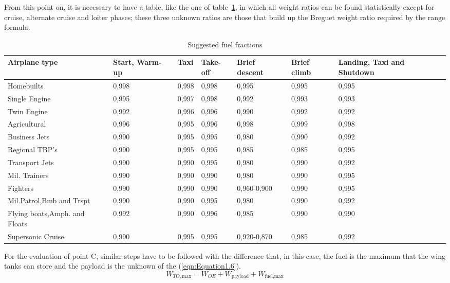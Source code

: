 \noindent
From this point on, it is necessary to have a table, like the one of table~\ref{table:Table1}, in which all weight ratios can be found statistically except for cruise, alternate cruise and loiter phases; these three unknown ratios are those that build up the Breguet weight ratio required by the range formula.   

\bigskip
\begin{table}[!ht]
\centering
\begin{tabular}{p{2.7cm}p{1.8cm}p{1.1cm}p{1.7cm}p{2.4cm}p{1.2cm}p{2.1cm}}
\toprule
\textbf{Airplane type} & \textbf{Start}, \textbf{Warm-up} & \textbf{Taxi} & \textbf{Take-off} & \textbf{Brief descent} & \textbf{Brief climb} & \textbf{Landing, Taxi and Shutdown} \\
\midrule
Homebuilts                     & 0,998 & 0,998 & 0,998 & 0,995 & 0,995 & 0,995       \\[0.7cm]
Single Engine                  & 0,995 & 0,997 & 0,998 & 0,992 & 0,993 & 0,993       \\[0.7cm]
Twin Engine                    & 0,992 & 0,996 & 0,996 & 0,990 & 0,992 & 0,992       \\[0.7cm]
Agricultural                   & 0,996 & 0,995 & 0,996 & 0,998 & 0,999 & 0,998       \\[0.7cm]
Business Jets                  & 0,990 & 0,995 & 0,995 & 0,980 & 0,990 & 0,992       \\[0.7cm]
Regional TBP's                 & 0,990 & 0,995 & 0,995 & 0,985 & 0,985 & 0,995       \\[0.7cm]
Transport Jets                 & 0,990 & 0,990 & 0,995 & 0,980 & 0,990 & 0,992       \\[0.7cm]
Mil. Trainers                  & 0,990 & 0,990 & 0,990 & 0,980 & 0,990 & 0,995       \\[0.7cm]
Fighters                       & 0,990 & 0,990 & 0,990 & 0,960-0,900 & 0,990 & 0,995     \\[0.7cm]
Mil.Patrol,Bmb and Trspt       & 0,990 & 0,990 & 0,995 & 0,980 & 0,990 & 0,992       \\[0.7cm]
Flying boats,Amph. and Floats  & 0,992 & 0,990 & 0,996 & 0,985 & 0,990 & 0,990       \\[1.2	cm]
Supersonic Cruise              & 0,990 & 0,995 & 0,995 & 0,920-0,870 & 0,985 & 0,992     \\[0.1	cm]
\bottomrule
\end{tabular}
\caption{Suggested fuel fractions}
\label{table:Table1}
\end{table}
%
\noindent
For the evaluation of point C, similar steps have to be followed with the difference that, in this case, the fuel is the maximum that the wing tanks can store and the payload is the unknown of the (\ref{eqn:Equation1.6}).
%
\begin{equation}
W_{TO,\text{max}}=W_{OE}+W_{\text{payload}}+W_{\text{fuel,max}}
\label{eqn:Equation1.6}
\end{equation}

